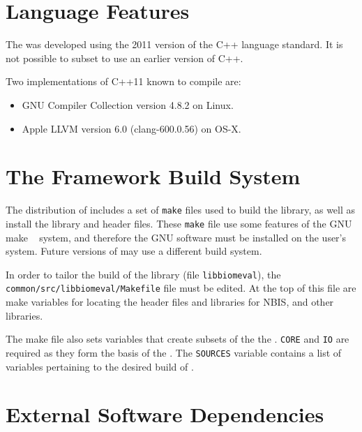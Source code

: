 %
%
\section{Language Features}

The \lname was developed using the 2011 version of the C++ language standard.
It is not possible to subset \sname to use an earlier version of C++.

Two implementations of C++11 known to compile \sname are:
\begin{itemize}
\item GNU Compiler Collection version 4.8.2 on Linux.
\item Apple LLVM version 6.0 (clang-600.0.56) on OS-X.
\end{itemize}

\section{The Framework Build System}

The distribution of \sname includes a set of \texttt{make} files used to build
the \sname library, as well as install the library and header files. These
\texttt{make} file use some features of the GNU make ~\cite{gnumake}
system, and therefore the GNU software must be installed on the user's system.
Future versions of \sname may use a different build system.

In order to tailor the build of the \sname library (file \texttt{libbiomeval}),
the \texttt{common/src/libbiomeval/Makefile} file must be edited. At the top of
this file are make variables for locating the header files and libraries for
NBIS, and other libraries.

The make file also sets variables that create subsets of the the \sname.
\texttt{CORE} and \texttt{IO} are required as they form the basis of the
\sname. The \texttt{SOURCES} variable contains a list of variables pertaining
to the desired build of \sname.

\section{External Software Dependencies}

